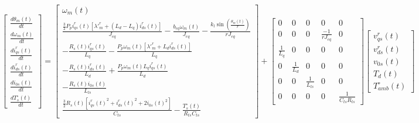 \documentclass[a4paper, 10pt, onecolumn,journal]{ieeeconf}
\begin{document}
\begin{equation}
    \begin{bmatrix} 
        \frac{d \theta_m(t)}{dt} \\ 
        \frac{d \omega_m(t)}{dt} \\ 
        \frac{d i^r_{qs}(t)}{dt} \\ 
        \frac{d i^r_{ds}(t)}{dt} \\ 
        \frac{d i_{0s}(t)}{dt} \\ 
        \frac{d T^\circ_s(t)}{dt} 
    \end{bmatrix} 
        = 
    \begin{bmatrix} 
        \omega_m(t) \\ 
        \frac{\frac{3}{2} P_p i^r_{qs}(t)\left[\lambda'^r_m + (L_d - L_q) i^r_{ds}(t) \right]}{J_{eq}} - \frac{b_{eq}\omega_m(t)}{J_{eq}} - \frac{k_l\sin\left(\frac{\theta_m(t)}{r}\right)}{rJ_{eq}}\\ 
        -\frac{R_s(t) i^r_{qs}(t)}{L_q} - \frac{P_p \omega_m(t) \left[\lambda'^r_m + L_d i^r_{ds}(t)\right]}{L_q}\\ 
        -\frac{R_s(t) i^r_{ds}(t)}{L_d} + \frac{P_p \omega_m(t) L_q  i^r_{qs}(t)}{L_d}  \\ 
        -\frac{R_s(t) i_{0s}(t) }{L_{ls}} \\ 
        \frac{\frac{3}{2} R_s(t) \left[ {i^r_{qs}(t)}^2 + {i^r_{ds}(t)}^2 + 2 {i_{0s}(t)}^2 \right]}{C_{ts}} - \frac{T_s^{\circ}(t)}{R_{ts}C_{ts}}
    \end{bmatrix}
        + 
    \begin{bmatrix} 
        0 & 0 & 0 & 0 & 0 \\ 
        0 & 0 & 0 & \frac{-1}{r J_{eq}} & 0 \\ 
        \frac{1}{L_q} & 0 & 0 & 0 & 0\\ 
        0 & \frac{1}{L_d} & 0 & 0 & 0 \\ 
        0 & 0 & \frac{1}{L_{ls}}  & 0 & 0 \\ 
        0 & 0 & 0 & 0 & \frac{1}{C_{ts} R_{ts}}
    \end{bmatrix} 
    \begin{bmatrix} 
        v^r_{qs}(t) \\ 
        v^r_{ds}(t) \\ 
        v_{0s}(t) \\
        T_d(t) \\ 
        T^{\circ}_{amb}(t)
    \end{bmatrix}
    \label{ecuacion vectorial de estado jacobi}
\end{equation}
\end{document}

